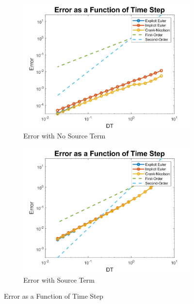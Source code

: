 \documentclass[10pt, letter, showtrims]{extarticle}
\begin{document}
		\FloatBarrier
		\begin{figure}[h]
		\captionsetup{justification=centering}
		\centering
			\begin{subfigure}{.45\textwidth}
				\centering
				\includegraphics[width=\linewidth]{"Figures/MATLAB/ConstantDXNoSource"}
				\caption{Error with No Source Term}
				\label{fig:temporalnosource}
			\end{subfigure}
			\begin{subfigure}{.45\textwidth}
				\centering
				\includegraphics[width=\linewidth]{"Figures/MATLAB/ConstantDXSource"}
				\caption{Error with Source Term}
				\label{fig:temporalsource}
			\end{subfigure}
		\caption{Error as a Function of Time Step}
		\label{fig:temporal}
		\end{figure}		
		\FloatBarrier
		
\end{document}
